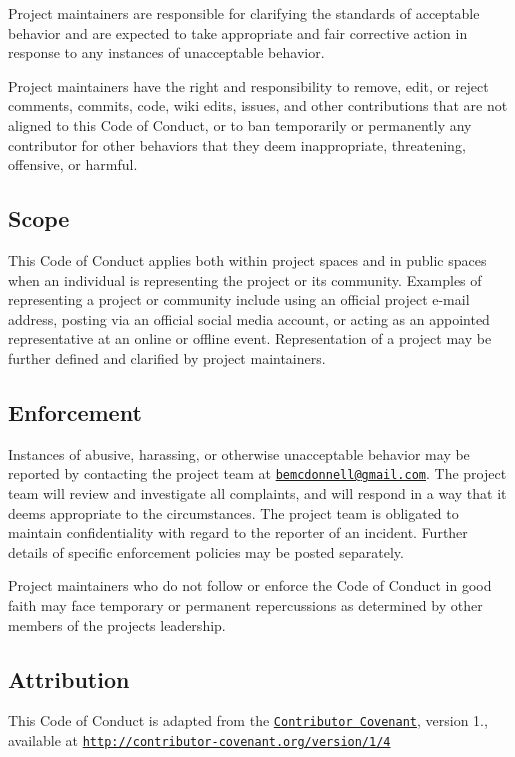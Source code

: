 Project maintainers are responsible for clarifying the standards of acceptable behavior and are expected to take appropriate and fair corrective action in response to any instances of unacceptable behavior.

Project maintainers have the right and responsibility to remove, edit, or reject comments, commits, code, wiki edits, issues, and other contributions that are not aligned to this Code of Conduct, or to ban temporarily or permanently any contributor for other behaviors that they deem inappropriate, threatening, offensive, or harmful.

\subsection*{Scope}

This Code of Conduct applies both within project spaces and in public spaces when an individual is representing the project or its community. Examples of representing a project or community include using an official project e-\/mail address, posting via an official social media account, or acting as an appointed representative at an online or offline event. Representation of a project may be further defined and clarified by project maintainers.

\subsection*{Enforcement}

Instances of abusive, harassing, or otherwise unacceptable behavior may be reported by contacting the project team at \href{mailto:bemcdonnell@gmail.com}{\tt bemcdonnell@gmail.\+com}. The project team will review and investigate all complaints, and will respond in a way that it deems appropriate to the circumstances. The project team is obligated to maintain confidentiality with regard to the reporter of an incident. Further details of specific enforcement policies may be posted separately.

Project maintainers who do not follow or enforce the Code of Conduct in good faith may face temporary or permanent repercussions as determined by other members of the project\textquotesingle{}s leadership.

\subsection*{Attribution}

This Code of Conduct is adapted from the \href{http://contributor-covenant.org}{\tt Contributor Covenant}, version 1., available at \href{http://contributor-covenant.org/version/1/4/}{\tt http\+://contributor-\/covenant.\+org/version/1/4} 